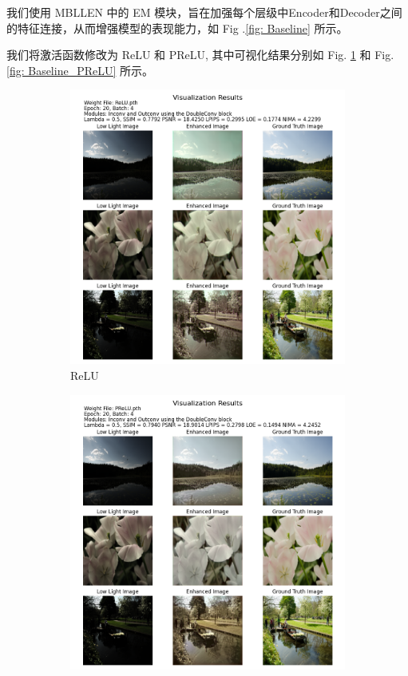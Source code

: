 \documentclass[a4paper]{ctexart}
\begin{document}
		我们使用 MBLLEN\cite{lv2018mbllen} 中的 EM 模块，旨在加强每个层级中Encoder和Decoder之间的特征连接，从而增强模型的表现能力，如 Fig .\ref{fig: Baseline} 所示。

		
		我们将激活函数修改为 ReLU 和 PReLU, 其中可视化结果分别如 Fig. \ref{fig: Baseline_ReLU} 和 Fig. \ref{fig: Baseline_PReLU} 所示。
		
		\begin{figure}[htbp]
			\centering
			\begin{subfigure}{0.45\textwidth}
				\includegraphics[width=\linewidth]{picture/LLIE/Experiment/myplot_UNet_ReLU}
				\captionsetup{font=scriptsize}
				\caption{ReLU}
				\label{fig: Baseline_ReLU}	
			\end{subfigure}
			\begin{subfigure}{0.45\textwidth}
				\includegraphics[width=\linewidth]{picture/LLIE/Experiment/myplot_UNet_PReLU}

\end{subfigure}
\end{figure}
\end{document}
